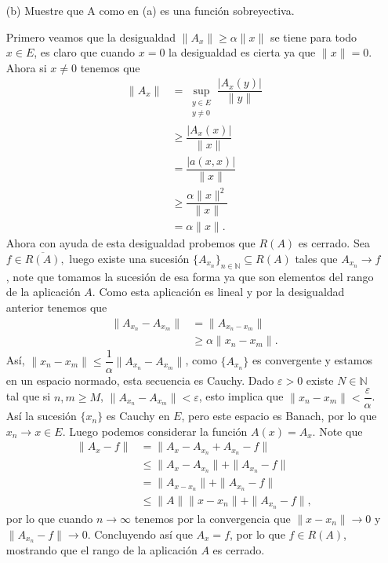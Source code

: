\begin{itemize}
\begin{sproof}
    \end{sproof}
    \item[(b)] Muestre que A como en (a) es una función sobreyectiva.
    \begin{sproof}
      Primero veamos que la desigualdad $\|A_x\|\geq \alpha\|x\|$ se tiene para todo $x\in E$, es claro que cuando $x=0$ la desigualdad es cierta ya que $\|x\|=0$. Ahora si $x\neq 0$ tenemos que
      \begin{align*}
        \|A_x\|&=\sup_{\substack{y\in E\\y\neq 0}}\dfrac{|A_x(y)|}{\|y\|}\\
        &\geq \dfrac{|A_x(x)|}{\|x\|}\\
        &= \dfrac{|a(x,x)|}{\|x\|}\\
        &\geq \dfrac{\alpha\|x\|^2}{\|x\|}\\
        &=\alpha\|x\|.
      \end{align*}
       Ahora con ayuda de esta desigualdad probemos que $R(A)$ es cerrado. Sea $f\in\overline{R(A)},$ luego existe una sucesión $\{A_{x_n}\}_{n\in\mathbb{N}}\subseteq R(A)$ tales que $A_{x_n}\to f$, note que tomamos la sucesión de esa forma ya que son elementos del rango de la aplicación $A.$ Como esta aplicación es lineal y por la desigualdad anterior tenemos que
       \begin{align*}
         \|A_{x_n}-A_{x_m}\|&=\|A_{x_n-x_m}\|\\
         &\geq \alpha\|x_n-x_m\|.
       \end{align*}
       Así, $\|x_n-x_m\|\leq\dfrac{1}{\alpha}\|A_{x_n}-A_{x_m}\|$, como $\{A_{x_n}\}$ es convergente y estamos en un espacio normado, esta secuencia es Cauchy. Dado $\varepsilon>0$ existe $N\in \mathbb{N}$ tal que si $n,m\geq M$, $\|A_{x_n}-A_{x_m}\|<\varepsilon$, esto implica que $\|x_n-x_m\|<\dfrac{\varepsilon}{\alpha}$. Así la sucesión $\{x_n\}$ es Cauchy en $E$, pero este espacio es Banach, por lo que $x_n\to x\in E $. Luego podemos considerar la función $A(x)=A_x.$ Note que
       \begin{align*}
         \|A_x-f\|&=\|A_x-A_{x_n}+A_{x_n}-f\|\\
         &\leq \|A_x-A_{x_n}\|+\|A_{x_n}-f\|\\
         &=\|A_{x-x_n}\|+\|A_{x_n}-f\|\\
         &\leq\|A\|\|x-x_n\|+\|A_{x_n}-f\|,
       \end{align*}
       por lo que cuando $n\to\infty$ tenemos por la convergencia que $\|x-x_n\|\to 0$ y $\|A_{x_n}-f\|\to 0$. Concluyendo así que $A_x=f$, por lo que $f\in R(A)$, mostrando que el rango de la aplicación $A$ es cerrado.


\end{sproof}
\end{itemize}
